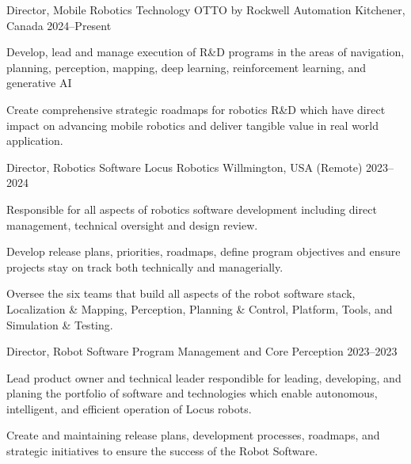 \documentclass[11pt, a4paper]{awesome-cv}
\begin{document}
\vspace*{-5mm}
\begin{cventries}
\vspace*{-1mm}
\cventry
  {Director, Mobile Robotics Technology}
  {OTTO by Rockwell Automation}
  {Kitchener, Canada}
  {2024--Present}
  {
    \begin{cvitems}
      \item Develop, lead and manage execution of R\&D programs in the areas of navigation, planning, perception, mapping, deep learning, reinforcement learning, and generative AI
      \item Create comprehensive strategic roadmaps for robotics R\&D which have direct impact on advancing mobile robotics and deliver tangible value in real world application.
    \end{cvitems}
  }

\vspace*{-1mm}
\cventry
  {Director, Robotics Software}
  {Locus Robotics}
  {Willmington, USA (Remote)}
  {2023--2024}
  {
    \begin{cvitems}
      \item Responsible for all aspects of robotics software development including direct management, technical oversight and design review.
      \item Develop release plans, priorities, roadmaps, define program objectives and ensure projects stay on track both technically and managerially.
      \item Oversee the six teams that build all aspects of the robot software stack, Localization \& Mapping, Perception, Planning \& Control, Platform, Tools, and Simulation \& Testing.
    \end{cvitems}
  }

\vspace*{-2mm}
\cventry
  {Director, Robot Software Program Management and Core Perception}
  {}
  {}
  {2023--2023}
  {
    \begin{cvitems}
      \item Lead product owner and technical leader respondible for leading, developing, and planing the portfolio of software and technologies which enable autonomous, intelligent, and efficient operation of Locus robots.
      \item Create and maintaining release plans, development processes, roadmaps, and strategic initiatives to ensure the success of the Robot Software.
    \end{cvitems} 
  }



\end{cventries}
\end{document}
